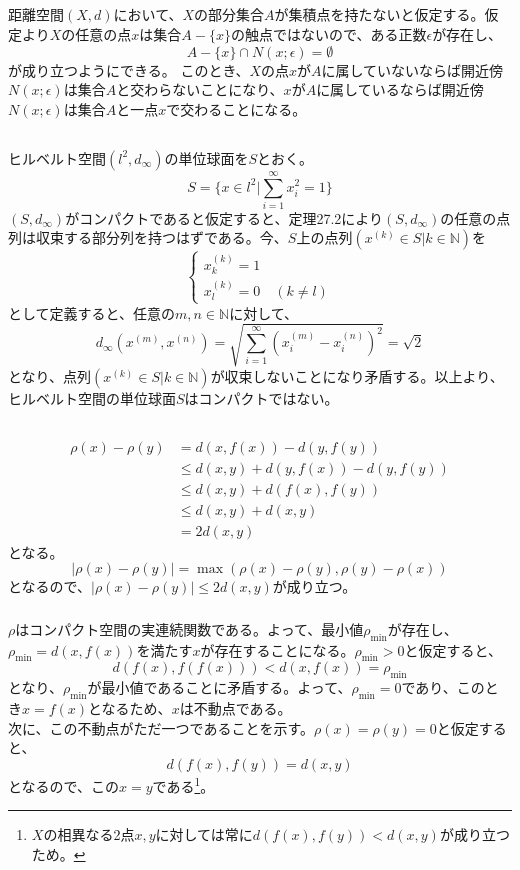 \documentclass{jsarticle}
\begin{document}
\subsection{}
距離空間$(X,d)$において、$X$の部分集合$A$が集積点を持たないと仮定する。仮定より$X$の任意の点$x$は集合$A-\{x\}$の触点ではないので、ある正数$\epsilon$が存在し、
\[A-\{x\}\cap N(x;\epsilon)=\emptyset\]
が成り立つようにできる。
このとき、$X$の点$x$が$A$に属していないならば開近傍$N(x;\epsilon)$は集合$A$と交わらないことになり、$x$が$A$に属しているならば開近傍$N(x;\epsilon)$は集合$A$と一点$x$で交わることになる。


\subsection{}
ヒルベルト空間$(l^2,d_\infty)$の単位球面を$S$とおく。
\[S=\{x\in l^2|\sum_{i=1}^\infty x_i^2=1\}\]
$(S,d_\infty)$がコンパクトであると仮定すると、定理27.2により$(S,d_\infty)$の任意の点列は収束する部分列を持つはずである。今、$S$上の点列$(x^{(k)}\in S|k\in \mathbb{N})$を
\[
\begin{cases}
x_k^{(k)}=1\\
x_l^{(k)}=0\quad(k\neq l)
\end{cases}
\]
として定義すると、任意の$m,n\in\mathbb{N}$に対して、
\[d_\infty(x^{(m)},x^{(n)})=\sqrt{\sum_{i=1}^\infty (x_i^{(m)}-x_i^{(n)})^2}=\sqrt{2}\]
となり、点列$(x^{(k)}\in S|k\in \mathbb{N})$が収束しないことになり矛盾する。以上より、ヒルベルト空間の単位球面$S$はコンパクトではない。


\subsection{}
\subsubsection{}
\begin{align*}
\rho(x)-\rho(y)&=d(x,f(x))-d(y,f(y))\\
&\leq d(x,y)+d(y,f(x))-d(y,f(y))\\
&\leq d(x,y)+d(f(x),f(y))\\
&\leq d(x,y)+d(x,y)\\
&=2 d(x,y)
\end{align*}
となる。
\[|\rho(x)-\rho(y)|=\max(\rho(x)-\rho(y),\rho(y)-\rho(x))\]
となるので、$|\rho(x)-\rho(y)|\leq 2d(x,y)$が成り立つ。

\subsubsection{}
$\rho$はコンパクト空間の実連続関数である。よって、最小値$\rho_{\min}$が存在し、$\rho_{\min}=d(x,f(x))$を満たす$x$が存在することになる。$\rho_{\min}>0$と仮定すると、
\[d(f(x),f(f(x)))<d(x,f(x))=\rho_{\min}\]
となり、$\rho_{\min}$が最小値であることに矛盾する。よって、$\rho_{\min}=0$であり、このとき$x=f(x)$となるため、$x$は不動点である。\\
次に、この不動点がただ一つであることを示す。$\rho(x)=\rho(y)=0$と仮定すると、
\[d(f(x),f(y))=d(x,y)\]
となるので、この$x=y$である\footnote{$X$の相異なる2点$x,y$に対しては常に$d(f(x),f(y))<d(x,y)$が成り立つため。}。
\end{document}
